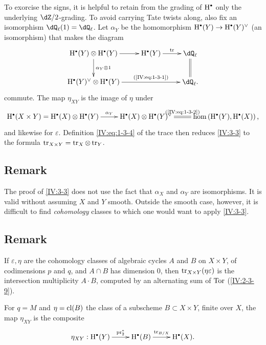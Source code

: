 To exorcise the signs, it is helpful to retain from the grading of
$\h^\bullet$ only the underlying $\dZ/2$-grading. To avoid carrying Tate
twists along, also fix an isomorphism $\dQ_\ell(1)=\dQ_\ell$. Let $\alpha_Y$
be the homomorphism $\h^\bullet(Y)\to \h^\bullet(Y)^\vee$ (an isomorphism)
that makes the diagram
\[\xymatrix{
  \h^\bullet(Y)\otimes \h^\bullet(Y) \ar[r] \ar[d]^-{\alpha_Y\otimes 1}
    & \h^\bullet(Y) \ar[r]^-{\tr}
    & \dQ_\ell \ar@{=}[d] \\
  \h^\bullet(Y)^\vee \otimes \h^\bullet(Y) \ar[rr]^-{\text{(\ref{IV:eq:1-3-1})}}
    & & \dQ_\ell \text{.}
}\]
commute. The map $\eta_{X Y}$ is the image of $\eta$ under
\[\xymatrix{
  \h^\bullet(X\times Y) = \h^\bullet(X)\otimes \h^\bullet(Y) \ar[r]^-{\alpha_Y}
    & \h^\bullet(X) \otimes \h^\bullet(Y)^\vee \ar@{=}[r]^-{\text{(\ref{IV:eq:1-3-2})}}
    & \hom\left(\h^\bullet(Y),\h^\bullet(X)\right) \text{,}
}\]
and likewise for $\varepsilon$. Definition \ref{IV:eq:1-3-4} of the trace
then reduces \ref{IV:3-3} to the formula
$\operatorname{tr}_{X\times Y}=\operatorname{tr}_X\otimes \operatorname{tr}_Y$.






\subsection{Remark}\label{IV:3-4}

The proof of \ref{IV:3-3} does not use the fact that $\alpha_X$ and
$\alpha_Y$ are isomorphisms. It is valid without assuming $X$ and $Y$
smooth. Outside the smooth case, however, it is difficult to find
\emph{cohomology} classes to which one would want to apply \ref{IV:3-3}.






\subsection{Remark}\label{IV:3-5}

If $\varepsilon,\eta$ are the cohomology classes of algebraic cycles $A$ and
$B$ on $X\times Y$, of codimensions $p$ and $q$, and $A\cap B$ has dimension
$0$, then $\operatorname{tr}_{X\times Y}(\eta\varepsilon)$ is the intersection
multiplicity $A\cdot B$, computed by an alternating sum of $\operatorname{Tor}$
(\ref{IV:2-3-9}).






\begin{proposition_}\label{IV:3-6}
For $q=M$ and $\eta=\operatorname{cl}(B)$ the class of a subscheme
$B\subset X\times Y$, finite over $X$, the map $\eta_{X Y}$ is the composite
\[\xymatrix{
  \eta_{X Y} : \h^\bullet(Y) \ar[r]^-{\operatorname{pr}_2^\ast}
    & \h^\bullet(B) \ar[r]^-{\tr_{B/X}}
    & \h^\bullet(X) \text{.}
}\]
\end{proposition_}

